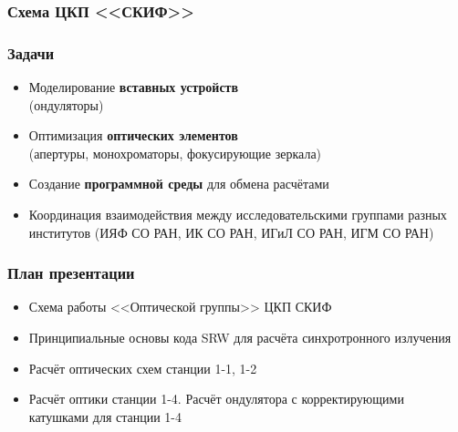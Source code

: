 \documentclass[14pt, hyperref = {colorlinks}]{beamer}
\begin{document}
\small
\begin{frame}
\frametitle{Схема ЦКП <<СКИФ>>}\label{t1}
\vspace{-10pt}
\begin{figure}[h]
\end{figure}
\end{frame}

\small
\begin{frame}
\frametitle{Задачи}\label{t1}
\begin{center}
\begin{itemize}
	\item Моделирование \textbf{вставных устройств} \\(ондуляторы)
  	\item Оптимизация \textbf{оптических элементов} \\(апертуры, монохроматоры, фокусирующие зеркала)
  	\item Создание \textbf{программной среды} для обмена расчётами
	\item Координация взаимодействия между исследовательскими группами разных институтов (ИЯФ СО РАН, ИК СО РАН, ИГиЛ СО РАН, ИГМ СО РАН)
\end{itemize}
\end{center}
\end{frame}



\small
\begin{frame}
\frametitle{План презентации}\label{t1}
\begin{center}
		\begin{itemize}
		\item Схема работы <<Оптической группы>> ЦКП СКИФ
		\item Принципиальные основы кода SRW для расчёта синхротронного излучения
		\item Расчёт оптических схем станции 1-1, 1-2
		\item Расчёт оптики станции 1-4. Расчёт ондулятора с корректирующими катушками для станции 1-4
	\end{itemize}
\end{center}
\end{frame}
\end{document}
